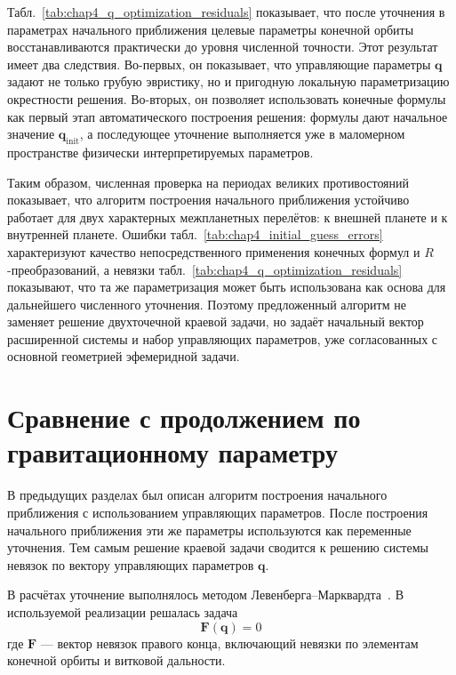 Табл.~\ref{tab:chap4_q_optimization_residuals} показывает, что после уточнения в параметрах начального приближения целевые параметры конечной орбиты восстанавливаются практически до уровня численной точности. Этот результат имеет два следствия. Во-первых, он показывает, что управляющие параметры \(\mathbf q\) задают не только грубую эвристику, но и пригодную локальную параметризацию окрестности решения. Во-вторых, он позволяет использовать конечные формулы как первый этап автоматического построения решения: формулы дают начальное значение \(\mathbf q_{\mathrm{init}}\), а последующее уточнение выполняется уже в маломерном пространстве физически интерпретируемых параметров.

Таким образом, численная проверка на периодах великих противостояний показывает, что алгоритм построения начального приближения устойчиво работает для двух характерных межпланетных перелётов: к внешней планете и к внутренней планете. Ошибки табл.~\ref{tab:chap4_initial_guess_errors} характеризуют качество непосредственного применения конечных формул и \(R\)-преобразований, а невязки табл.~\ref{tab:chap4_q_optimization_residuals} показывают, что та же параметризация может быть использована как основа для дальнейшего численного уточнения. Поэтому предложенный алгоритм не заменяет решение двухточечной краевой задачи, но задаёт начальный вектор расширенной системы и набор управляющих параметров, уже согласованных с основной геометрией эфемеридной задачи.

\section{Сравнение с продолжением по гравитационному параметру}
\label{sec:ch4_gravity_continuation_comparison}

В предыдущих разделах был описан алгоритм построения начального приближения с использованием управляющих параметров. После построения начального приближения эти же параметры используются как переменные уточнения. Тем самым решение краевой задачи сводится к решению системы невязок по вектору управляющих параметров \(\mathbf q\).

В расчётах уточнение выполнялось методом Левенберга--Марквардта~\cite{levenberg_method_1944,marquardt_algorithm_1963}. В используемой реализации решалась задача
\begin{equation}
	\mathbf F(\mathbf q)=0
\end{equation}
где \(\mathbf F\) --- вектор невязок правого конца, включающий невязки по элементам конечной орбиты и витковой дальности.


